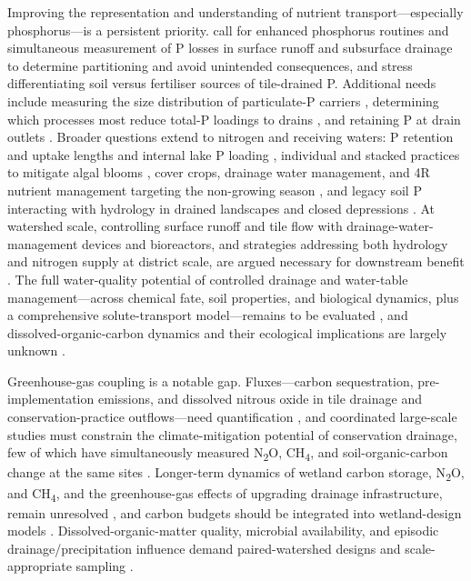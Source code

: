 Improving the representation and understanding of nutrient transport---especially
phosphorus---is a persistent priority. \textcite{King2015} call for enhanced
phosphorus routines and simultaneous measurement of P losses in surface runoff and
subsurface drainage to determine partitioning and avoid unintended consequences,
and \textcite{Williams2016} stress differentiating soil versus fertiliser sources
of tile-drained P. Additional needs include measuring the size distribution of
particulate-P carriers \parencite{Qi2018}, determining which processes most reduce
total-P loadings to drains \parencite{Geohring2001}, and retaining P at drain
outlets \parencite{Zimmer2016}. Broader questions extend to nitrogen and
receiving waters: P retention and uptake lengths and internal lake P loading
\parencite{Clement2017}, individual and stacked practices to mitigate algal blooms
\parencite{King2018}, cover crops, drainage water management, and 4R nutrient
management targeting the non-growing season
\parencite{King2016,Kokulan2021}, and legacy soil P interacting with hydrology in
drained landscapes and closed depressions
\parencite{Mumbi2024,Mumbi2025b,Hanrahan2020}. At watershed scale, controlling
surface runoff and tile flow with drainage-water-management devices and
bioreactors, and strategies addressing both hydrology and nitrogen supply at
district scale, are argued necessary for downstream benefit
\parencite{Li2015,Ikenberry2014,Filipovic2015,BinShokrana2023,Koskiaho2002,Kladivko2005}.
The full water-quality potential of controlled drainage and water-table
management---across chemical fate, soil properties, and biological dynamics, plus a
comprehensive solute-transport model---remains to be evaluated
\parencite{FAUSEY1995,RITTER1995}, and dissolved-organic-carbon dynamics and their
ecological implications are largely unknown \parencite{Ruark2009,Furukawa2008}.

Greenhouse-gas coupling is a notable gap. Fluxes---carbon sequestration,
pre-implementation emissions, and dissolved nitrous oxide in tile drainage and
conservation-practice outflows---need quantification \parencite{Mitchell2023}, and
coordinated large-scale studies must constrain the climate-mitigation potential of
conservation drainage, few of which have simultaneously measured N\textsubscript{2}O,
CH\textsubscript{4}, and soil-organic-carbon change at the same sites
\parencite{Hall2025}. Longer-term dynamics of wetland carbon storage,
N\textsubscript{2}O, and CH\textsubscript{4}, and the greenhouse-gas effects of
upgrading drainage infrastructure, remain unresolved \parencite{Mitchell2022}, and
carbon budgets should be integrated into wetland-design models \parencite{Kadlec2012}.
Dissolved-organic-matter quality, microbial availability, and episodic
drainage/precipitation influence demand paired-watershed designs and
scale-appropriate sampling \parencite{Dalzell2011,Bellmore2015}.

